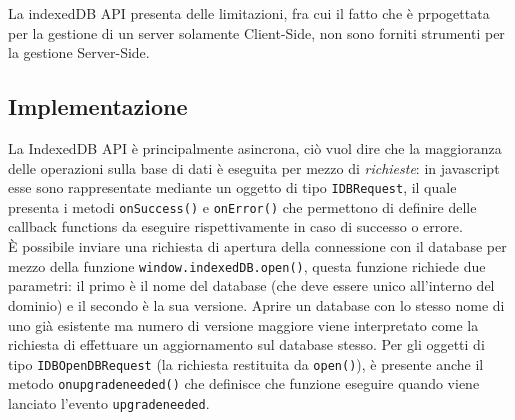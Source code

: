 \documentclass[a4paper, 12pt, twoside, openright]{book}
\begin{document}
La indexedDB API presenta delle limitazioni, fra cui il fatto che è prpogettata per la gestione di un server solamente Client-Side, non sono forniti strumenti per la gestione Server-Side.\\
\subsection{Implementazione}
La IndexedDB API è principalmente asincrona, ciò vuol dire che la maggioranza delle operazioni sulla base di dati è eseguita per mezzo di \textit{richieste}: in javascript esse sono rappresentate mediante un oggetto di tipo \texttt{IDBRequest}, il quale presenta i metodi \texttt{onSuccess()} e \texttt{onError()} che permettono di definire delle callback functions da eseguire rispettivamente in caso di successo o errore.\\
È possibile inviare una richiesta di apertura della connessione con il database per mezzo della funzione \texttt{window.indexedDB.open()}, questa funzione richiede due parametri: il primo è il nome del database (che deve essere unico all'interno del dominio) e il secondo è la sua versione. Aprire un database con lo stesso nome di uno già esistente ma numero di versione maggiore viene interpretato come la richiesta di effettuare un aggiornamento sul database stesso. Per gli oggetti di tipo \texttt{IDBOpenDBRequest} (la richiesta restituita da \texttt{open()}), è presente anche il metodo \texttt{onupgradeneeded()} che definisce che funzione eseguire quando viene lanciato l'evento \texttt{upgradeneeded}.\\
\backmatter

\begingroup %
  \makeatletter
  \let\ps@plain\ps@empty
  \makeatother
  
\endgroup
\end{document}
